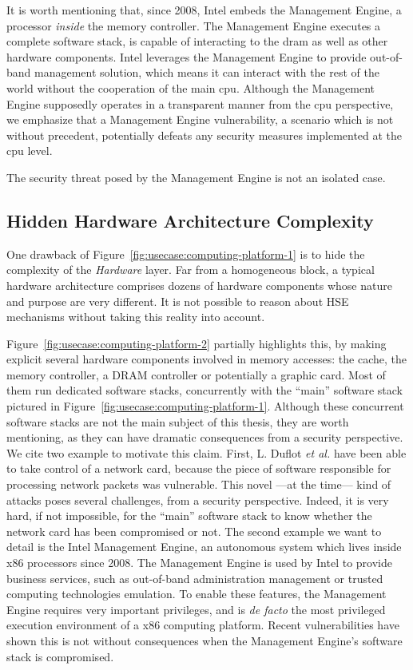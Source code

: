 It is worth mentioning that, since 2008, Intel embeds the Management Engine, a
processor \emph{inside} the memory controller.
%
The Management Engine executes a complete software stack, is capable of
interacting to the \ac{dram} as well as other hardware components.
%
Intel leverages the Management Engine to provide out-of-band management
solution, which means it can interact with the rest of the world without the
cooperation of the main \ac{cpu}.
%
Although the Management Engine supposedly operates in a transparent manner from
the \ac{cpu} perspective, we emphasize that a Management Engine vulnerability, a
scenario which is not without precedent, potentially defeats any security
measures implemented at the \ac{cpu} level.

The security threat posed by the Management Engine is not an isolated case.

\subsection{Hidden Hardware Architecture Complexity}

One drawback of Figure~\ref{fig:usecase:computing-platform-1} is to hide the
complexity of the \emph{Hardware} layer.
%
Far from a homogeneous block, a typical hardware architecture comprises dozens
of hardware components whose nature and purpose are very different.
%
It is not possible to reason about HSE mechanisms without taking this reality
into account.

Figure~\ref{fig:usecase:computing-platform-2} partially highlights this, by
making explicit several hardware components involved in memory accesses: the
cache, the memory controller, a DRAM controller or potentially a graphic card.
%
Most of them run dedicated software stacks, concurrently with the ``main''
software stack pictured in Figure~\ref{fig:usecase:computing-platform-1}.
%
Although these concurrent software stacks are not the main subject of this
thesis, they are worth mentioning, as they can have dramatic consequences from a
security perspective.
%
We cite two example to motivate this claim.
%
First, L. Duflot \emph{et al.} have been able to take control of a network card,
because the piece of software responsible for processing network packets was
vulnerable.
%
This novel ---at the time--- kind of attacks poses several challenges, from a
security perspective.
%
Indeed, it is very hard, if not impossible, for the ``main'' software stack to
know whether the network card has been compromised or not.
%
The second example we want to detail is the Intel Management Engine, an
autonomous system which lives inside x86 processors since 2008.
%
The Management Engine is used by Intel to provide business services, such as
out-of-band administration management or trusted computing technologies
emulation.
%
To enable these features, the Management Engine requires very important
privileges, and is \emph{de facto} the most privileged execution environment of
a x86 computing platform.
%
Recent vulnerabilities have shown this is not without consequences when the
Management Engine's software stack is compromised.

